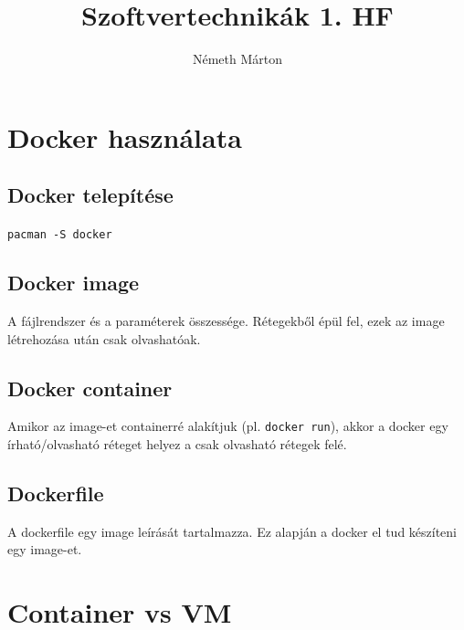 \documentclass[]{article}
\title{Szoftvertechnikák 1. HF}
\author{Németh Márton}
\numberwithin{equation}{section}
\begin{document}
\maketitle

\section{Docker használata}

\subsection{Docker telepítése}

\texttt{pacman -S docker}
\subsection{Docker image}

A fájlrendszer és a paraméterek összessége. Rétegekből épül fel, ezek az image létrehozása után csak olvashatóak.

\subsection{Docker container}
Amikor az image-et containerré alakítjuk (pl. \texttt{docker run}), akkor a docker egy írható/olvasható réteget helyez a csak olvasható rétegek felé.

\subsection{Dockerfile}

A dockerfile egy image leírását tartalmazza. Ez alapján a docker el tud készíteni egy image-et.

\section{Container vs VM}
\end{document}
